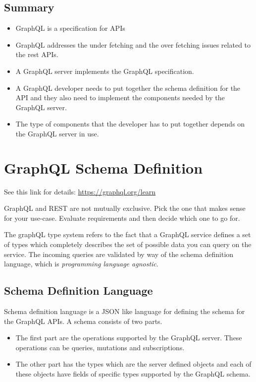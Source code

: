 \subsection{Summary}

\begin{itemize}
    \item GraphQL is a specification for APIs
    \item GraphQL addresses the under fetching and the over fetching issues related to the rest APIs.
    \item A GraphQL server implements the GraphQL specification.
    \item A GraphQL developer needs to put together the schema definition for the API and they also need to implement the components needed by the GraphQL server.
    \item The type of components that the developer has to put together depends on the GraphQL server in use.
\end{itemize}


\section{GraphQL Schema Definition}
See this link for details: \href{https://graphql.org/learn}{https://graphql.org/learn}

GraphQL and REST are not mutually exclusive.
Pick the one that makes sense for your use-case.
Evaluate requirements and then decide which one to go for.

The graphQL type system refers to the fact that a GraphQL service defines a set of types which completely describes the set of possible data you can query on the service.
The incoming queries are validated by way of the schema definition language, which is \textit{programming language agnostic}.

\subsection{Schema Definition Language}
Schema definition language is a JSON like language for defining the schema for the GraphQL APIs.
A schema consists of two parts.

\begin{itemize}
    \item The first part are the operations supported by the GraphQL server. These operations can be queries, mutations and subscriptions.
    \item The other part has the types which are the server defined objects and each of these objects have fields of specific types supported by the GraphQL schema.
\end{itemize}

